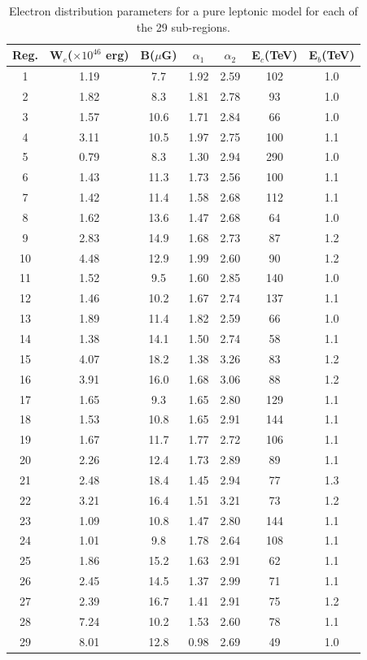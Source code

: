 \documentclass[12pt,a4paper]{article}
\begin{document}
\begin{table}[H] 
	\begin{center}
		\begin{tabular}{ccccccc}
			\toprule
			Reg.&W$_e$($\times 10^{46}$ erg)&B($\mu$G)&$\alpha_1$& $\alpha_2$ & E$_c$(TeV) & E$_b$(TeV)  \\
			\hline
			1 & 1.19 & 7.7 & 1.92 & 2.59 & 102 & 1.0 \\ 
			2  & 1.82 & 8.3 & 1.81 & 2.78 & 93 & 1.0 \\ 
			3  & 1.57 & 10.6 & 1.71 & 2.84 & 66 & 1.0 \\ 
			4 & 3.11 & 10.5 & 1.97 & 2.75 & 100 & 1.1 \\ 
			5 & 0.79 & 8.3 & 1.30 & 2.94 & 290 & 1.0 \\ 
			6 & 1.43 & 11.3 & 1.73 & 2.56 & 100 & 1.1 \\ 
			7 & 1.42 & 11.4 & 1.58 & 2.68 & 112 & 1.1 \\ 
			8 & 1.62 & 13.6 & 1.47 & 2.68 & 64 & 1.0 \\ 
			9 & 2.83 & 14.9 & 1.68 & 2.73 & 87 & 1.2 \\ 
			10 & 4.48 & 12.9 & 1.99 & 2.60 & 90 & 1.2 \\ 
			11 & 1.52 & 9.5 & 1.60 & 2.85 & 140 & 1.0 \\ 
			12 & 1.46 & 10.2 & 1.67 & 2.74 & 137 & 1.1 \\ 
			13 & 1.89 & 11.4 & 1.82 & 2.59 & 66 & 1.0 \\ 
			14 & 1.38 & 14.1 & 1.50 & 2.74 & 58 & 1.1 \\ 
			15 & 4.07 & 18.2 & 1.38 & 3.26 & 83 & 1.2 \\
			16 & 3.91 & 16.0 & 1.68 & 3.06 & 88 & 1.2 \\ 
			17 & 1.65 & 9.3 & 1.65 & 2.80 & 129 & 1.1 \\ 
			18 & 1.53 & 10.8 & 1.65 & 2.91 & 144 & 1.1 \\
			19 & 1.67 & 11.7 & 1.77 & 2.72 & 106 & 1.1 \\
			20 & 2.26 & 12.4 & 1.73 & 2.89 & 89 & 1.1 \\ 
			21 & 2.48 & 18.4 & 1.45 & 2.94 & 77 & 1.3 \\ 
			22 & 3.21 & 16.4 & 1.51 & 3.21 & 73 & 1.2 \\ 
			23 & 1.09 & 10.8 & 1.47 & 2.80 & 144 & 1.1 \\
			24 & 1.01 & 9.8 & 1.78 & 2.64 & 108 & 1.1 \\ 
			25 & 1.86 & 15.2 & 1.63 & 2.91 & 62 & 1.1 \\ 
			26 & 2.45 & 14.5 & 1.37 & 2.99 & 71 & 1.1 \\ 
			27 & 2.39 & 16.7 & 1.41 & 2.91 & 75 & 1.2 \\ 
			28 & 7.24 & 10.2 & 1.53 & 2.60 & 78 & 1.1 \\ 
			29 & 8.01 & 12.8 & 0.98 & 2.69 & 49 & 1.0 \\ 
			\bottomrule
		\end{tabular} 
	\end{center}
	\caption{Electron distribution parameters for a pure leptonic model for each of the 29 sub-regions.}
	\label{tab:regionalparams}
\end{table}
\end{document}
